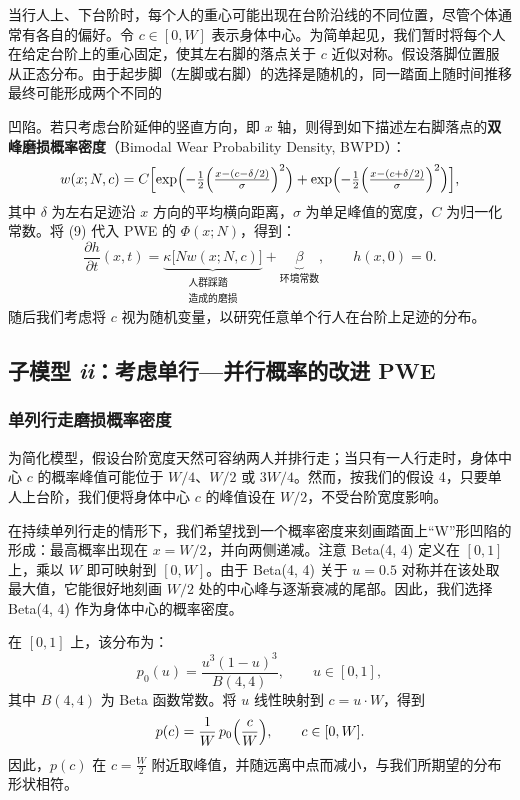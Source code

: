 \documentclass[11pt,a4paper,fontset=windows]{ctexart}
\begin{document}
当行人上、下台阶时，每个人的重心可能出现在台阶沿线的不同位置，尽管个体通常有各自的偏好。令 $c\in[0,W]$ 表示身体中心。为简单起见，我们暂时将每个人在给定台阶上的重心固定，使其左右脚的落点关于 $c$ 近似对称。假设落脚位置服从正态分布。由于起步脚（左脚或右脚）的选择是随机的，同一踏面上随时间推移最终可能形成两个不同的

凹陷。若只考虑台阶延伸的竖直方向，即 $x$ 轴，则得到如下描述左右脚落点的\textbf{双峰磨损概率密度}（Bimodal Wear Probability Density, BWPD）：
\begin{equation}
w(x;N,c)=C\Bigl[\exp\Bigl(-\tfrac12\Bigl(\tfrac{x-(c-\delta/2)}{\sigma}\Bigr)^{2}\Bigr)
+\exp\Bigl(-\tfrac12\Bigl(\tfrac{x-(c+\delta/2)}{\sigma}\Bigr)^{2}\Bigr)\Bigr],
\end{equation}
其中 $\delta$ 为左右足迹沿 $x$ 方向的平均横向距离，$\sigma$ 为单足峰值的宽度，$C$ 为归一化常数。将 (9) 代入 PWE 的 $\Phi(x;N)$，得到：
\begin{equation}
\frac{\partial h}{\partial t}(x,t)=
\underbrace{\kappa\bigl[Nw(x;N,c)\bigr]}_{\substack{\text{人群踩踏}\\[-2pt]\text{造成的磨损}}}
+
\underbrace{\beta}_{\text{环境常数}},
\qquad h(x,0)=0.
\end{equation}
随后我们考虑将 $c$ 视为随机变量，以研究任意单个行人在台阶上足迹的分布。

\subsection{子模型 \textit{ii}：考虑单行—并行概率的改进 PWE}

\subsubsection{单列行走磨损概率密度}

为简化模型，假设台阶宽度天然可容纳两人并排行走；当只有一人行走时，身体中心 $c$ 的概率峰值可能位于 $W/4$、$W/2$ 或 $3W/4$。然而，按我们的假设 4，只要单人上台阶，我们便将身体中心 $c$ 的峰值设在 $W/2$，不受台阶宽度影响。

在持续单列行走的情形下，我们希望找到一个概率密度来刻画踏面上“W”形凹陷的形成：最高概率出现在 $x=W/2$，并向两侧递减。注意 Beta(4, 4) 定义在 $[0,1]$ 上，乘以 $W$ 即可映射到 $[0,W]$。由于 Beta(4, 4) 关于 $u=0.5$ 对称并在该处取最大值，它能很好地刻画 $W/2$ 处的中心峰与逐渐衰减的尾部。因此，我们选择 Beta(4, 4) 作为身体中心的概率密度。\cite{6}

在 $[0,1]$ 上，该分布为：
\begin{equation}
p_0(u)=\frac{u^3(1-u)^3}{B(4,4)},\qquad u\in[0,1],
\end{equation}
其中 $B(4,4)$ 为 Beta 函数常数。将 $u$ 线性映射到 $c=u\cdot W$，得到
\begin{equation}
p(c)=\frac{1}{W}\,p_0\Bigl(\frac{c}{W}\Bigr),\qquad c\in[0,W].
\end{equation}
因此，$p(c)$ 在 $c=\frac{W}{2}$ 附近取峰值，并随远离中点而减小，与我们所期望的分布形状相符。
\end{document}
